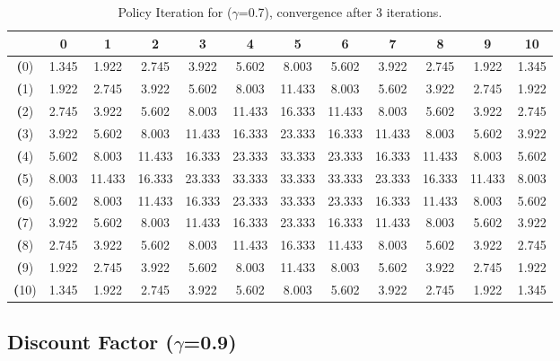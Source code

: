 \documentclass[11pt]{article}
\begin{document}
\begin{center}
\begin{table}[ht]
{\small
\hfill{}
\begin{tabular}{c|c|c|c|c|c|c|c|c|c|c|c}
\textbf{} & \textbf{0} & \textbf{1} & \textbf{2} & \textbf{3} & \textbf{4} & \textbf{5} & \textbf{6} & \textbf{7} & \textbf{8} & \textbf{9} & \textbf{10}\\
	\hline

\textbf(0)& 1.345	& 1.922	& 2.745	& 3.922	& 5.602	& 8.003	& 5.602	& 3.922	& 2.745	& 1.922	& 1.345	\\
\textbf(1)& 1.922	& 2.745	& 3.922	& 5.602	& 8.003	& 11.433	& 8.003	& 5.602	& 3.922	& 2.745	& 1.922	\\
\textbf(2)& 2.745	& 3.922	& 5.602	& 8.003	& 11.433	& 16.333	& 11.433	& 8.003	& 5.602	& 3.922	& 2.745	\\
\textbf(3)& 3.922	& 5.602	& 8.003	& 11.433	& 16.333	& 23.333	& 16.333	& 11.433	& 8.003	& 5.602	& 3.922	\\
\textbf(4)& 5.602	& 8.003	& 11.433	& 16.333	& 23.333	& 33.333	& 23.333	& 16.333	& 11.433	& 8.003	& 5.602	\\
\textbf(5)& 8.003	& 11.433	& 16.333	& 23.333	& 33.333	& 33.333	& 33.333	& 23.333	& 16.333	& 11.433	& 8.003	\\
\textbf(6)& 5.602	& 8.003	& 11.433	& 16.333	& 23.333	& 33.333	& 23.333	& 16.333	& 11.433	& 8.003	& 5.602	\\
\textbf(7)& 3.922	& 5.602	& 8.003	& 11.433	& 16.333	& 23.333	& 16.333	& 11.433	& 8.003	& 5.602	& 3.922	\\
\textbf(8)& 2.745	& 3.922	& 5.602	& 8.003	& 11.433	& 16.333	& 11.433	& 8.003	& 5.602	& 3.922	& 2.745	\\
\textbf(9)& 1.922	& 2.745	& 3.922	& 5.602	& 8.003	& 11.433	& 8.003	& 5.602	& 3.922	& 2.745	& 1.922	\\
\textbf(10)& 1.345	& 1.922	& 2.745	& 3.922	& 5.602	& 8.003	& 5.602	& 3.922	& 2.745	& 1.922	& 1.345	\\

\end{tabular}}
\hfill{}
\caption{Policy Iteration for ($\gamma$=0.7), convergence after 3 iterations.}
\label{gamma=0.7}
\end{table}
\end{center}


\subsection{Discount Factor ($\gamma$=0.9)}
\end{document}
